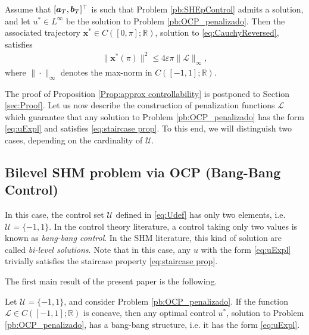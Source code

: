 \documentclass[twocolumn]{autart}    %
\begin{document}
\bigskip

\begin{proposition}\label{Prop:approx controllability}
Assume that $[\bm{a}_T,\bm{b}_T]^\top$ is such that Problem \ref{pb:SHEpControl} admits a solution, and let $u^\ast\in L^\infty$ be the solution to Problem \ref{pb:OCP_penalizado}. Then the associated trajectory $\bm{x}^\ast\in C([0,\pi];\mathbb{R})$, solution to \eqref{eq:CauchyReversed}, satisfies
\begin{align*} 
	\| \bm{x}^\ast (\pi)  \|^2 \leq  4 \varepsilon \pi \| \mathcal{L}\|_\infty,
\end{align*}
where $\| \cdot\|_\infty$ denotes the max-norm in $C([-1,1]; \mathbb{R})$.
\end{proposition}

The proof of Proposition \ref{Prop:approx controllability} is postponed to Section \ref{sec:Proof}. Let us now describe the construction of penalization functions $\mathcal{L}$ which guarantee that any solution to Problem \ref{pb:OCP_penalizado} has the form \eqref{eq:uExpl} and satisfies \eqref{eq:staircase prop}. To this end, we will distinguish two cases, depending on the cardinality of $\mathcal{U}$.

\subsection{Bilevel SHM problem via OCP (Bang-Bang Control)} 

In this case, the control set $\mathcal{U}$ defined in \eqref{eq:Udef} has only two elements, i.e.  $\mathcal{U}=\{-1,1\}$.
In the control theory literature, a control taking only two values is known as \emph{bang-bang control}. In the SHM literature, this kind of solution are called \textit{bi-level solutions}. Note that in this case, any $u$ with the form \eqref{eq:uExpl}  trivially satisfies the staircase property \eqref{eq:staircase prop}.

\bigskip

The first main result of the present paper is the following.

\bigskip
\begin{theorem}\label{th:bang-bang}
Let $\mathcal{U}=\{ -1, 1\}$, and consider Problem \ref{pb:OCP_penalizado}. If the function $\mathcal{L}\in C([-1,1];\mathbb{R})$ is concave, then any optimal control $u^\ast$, solution to Problem \ref{pb:OCP_penalizado}, has a bang-bang structure, i.e. it has the form \eqref{eq:uExpl}.
\end{theorem}
\end{document}
